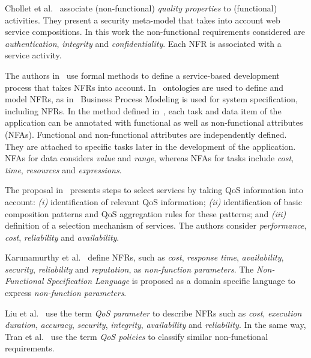 \documentclass{singlecol-new}
\theoremstyle{TH}{
\newtheorem{lemma}{Lemma}
\newtheorem{theorem}[lemma]{Theorem}
\newtheorem{corrolary}[lemma]{Corrolary}
\newtheorem{conjecture}[lemma]{Conjecture}
\newtheorem{proposition}[lemma]{Proposition}
\newtheorem{claim}[lemma]{Claim}
\newtheorem{stheorem}[lemma]{Wrong Theorem}
\newtheorem{algorithm}{Algorithm}
}
\theoremstyle{THrm}{
\newtheorem{definition}{Definition}[section]
\newtheorem{question}{Question}[section]
\newtheorem{remark}{Remark}
\newtheorem{scheme}{Scheme}
}
\theoremstyle{THhit}{
\newtheorem{case}{Case}[section]
}
\theoremstyle{THhsl}{
\newtheorem{example}{Example}
}
\begin{document}
Chollet et al.~\cite{CholletL09} associate (non-func\-tion\-al) \textit{quality properties} to
(functional) activities.
They present a security meta-model that takes into account web service compositions.
In this work the non-functional requirements considered are  \textit{authentication}, \textit{integrity} and \textit{confidentiality}.
Each NFR is associated with a service activity.




The authors in~\cite{ThissenW06,ZhangPSP05} use formal methods to define a service-based development process that takes NFRs into account.
In~\cite{AgarwalLS09,PastranaPK11} ontologies are used to define and model NFRs,
as  in~\cite{XiaoCZBOLH08,GutierrezRF10} Business Process Modeling is used for
system specification, including NFRs.
In the method defined in~\cite{XiaoCZBOLH08}, each task and data item of the application can be
annotated with functional as well as non-functional attributes (NFAs).
Functional and non-functional at\-tri\-butes are independently defined.
They are attached to specific tasks later in the development of the application.
NFAs for data considers \textit{value} and \textit{range}, whereas NFAs for tasks include \textit{cost}, \textit{time}, \textit{resources} and \textit{expressions}.

The proposal in~\cite{ThissenW06} presents steps to  select services
by taking QoS information into account:
\textit{(i)} identification of relevant QoS information;
\textit{(ii)} identification of basic composition patterns and
QoS aggregation rules for these patterns; and
\textit{(iii)} definition of a selection mechanism of services.
The authors consider  \textit{performance}, \textit{cost}, \textit{reliability} and
\textit{availability}.

Karunamurthy et al.~\cite{Karunamurthy2012787} define NFRs, such as \textit{cost}, \textit{response time}, \textit{availability}, \textit{security}, \textit{reliability} and \textit{reputation}, as  \textit{non-function parameters}.
The \textit{Non-Func\-tion\-al Specification Language} 
 is proposed as a domain specific language 
 to express \textit{non-function parameters}.

Liu et al.~\cite{Liu20121080} use the term \textit{QoS parameter} to describe NFRs such as \textit{cost}, \textit{execution duration}, \textit{accuracy}, \textit{security}, \textit{integrity}, \textit{availability} and \textit{reliability}.
In the same way, Tran et al.~\cite{Tran2012531} use the term \textit{QoS policies} to classify similar non-functional requirements.
\end{document}

